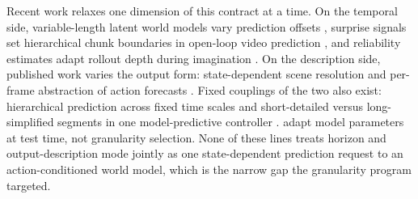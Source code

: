 Recent work relaxes one dimension of this contract at a time. On the temporal side, variable-length latent world models vary prediction offsets \citep{du2026vlwm}, surprise signals set hierarchical chunk boundaries in open-loop video prediction \citep{iiyama2026sunta}, and reliability estimates adapt rollout depth during imagination \citep{hafez2020improving}. On the description side, published work varies the output form: state-dependent scene resolution \citep{wang2023dynamic} and per-frame abstraction of action forecasts \citep{scarafoni2022islands}. Fixed couplings of the two also exist: hierarchical prediction across fixed time scales \citep{shaj2023multi,villarcorrales2022mspred} and short-detailed versus long-simplified segments in one model-predictive controller \citep{brudigam2021mpc}. \citet{wang2026adajepa} adapt model parameters at test time, not granularity selection. None of these lines treats horizon and output-description mode jointly as one state-dependent prediction request to an action-conditioned world model, which is the narrow gap the granularity program targeted.

